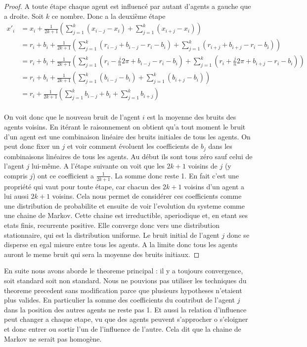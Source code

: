 ﻿\documentclass[a4paper,10pt]{report}
\begin{document}
\begin{proof}
A toute étape chaque agent est influencé par autant d'agents a gauche que a droite. Soit $k$ ce nombre. Donc a la deuxième étape
\begin{equation*}
\begin{split}
x'_i &= x_i + \frac{1}{2k+1} \left( \sum_{j=1}^k (x_{i-j} - x_i) + \sum_{j=1}^k (x_{i+j} - x_i) \right) \\
     &= r_i + b_i + \frac{1}{2k+1} \left( \sum_{j=1}^k (r_{i-j} + b_{i-j} - r_i - b_i) + \sum_{j=1}^k (r_{i+j} + b_{i+j} - r_i - b_i) \right) \\
     &= r_i + b_i + \frac{1}{2k+1} \left( \sum_{j=1}^k (r_i - \frac{j}{n}2 \pi + b_{i-j} - r_i - b_i) + \sum_{j=1}^k (r_i + \frac{j}{n}2 \pi + b_{i+j} - r_i - b_i) \right) \\
     &= r_i + b_i + \frac{1}{2k+1} \left( \sum_{j=1}^k (b_{i-j} - b_i) + \sum_{j=1}^k (b_{i+j} - b_i) \right) \\
     &= r_i + \frac{1}{2k+1} \left( \sum_{j=1}^k b_{i-j} + b_i + \sum_{j=1}^k b_{i+j} \right) \\
\end{split}
\end{equation*}

On voit donc que le nouveau bruit de l'agent $i$ est la moyenne des bruits des agents voisins. En itérant le raisonnement on obtient qu'a tout moment le bruit d'un agent est une combinaison linéaire des bruits initiales de tous les agents. On peut donc fixer un $j$ et voir comment évoluent les coefficients de $b_j$ dans les combinaisons linéaires de tous les agents. Au début ils sont tous zéro sauf celui de l'agent $j$ lui-même. A l’étape suivante on voit que les $2k+1$ voisins de $j$ (y compris $j$) ont ce coefficient a $\frac{1}{2k+1}$. La somme donc reste 1. En fait c'est une propriété qui vaut pour toute étape, car chacun des $2k+1$ voisins d'un agent a lui aussi $2k+1$ voisins. Cela nous permet de considérer ces coefficients comme une distribution de probabilite et ensuite de voir l'evolution du systeme comme une chaine de Markov. Cette chaine est irreductible, aperiodique et, en etant ses etats finis, recurrente positive. Elle converge donc vers une distribution stationnaire, qui est la distribution uniforme. Le bruit initial de l'agent $j$ donc se disperse en egal misure entre tous les agents. A la limite donc tous les agents auront le meme bruit qui sera la moyenne des bruits initiaux.
\end{proof}

En suite nous avons aborde le theoreme principal : il y a toujours convergence, soit standard soit non standard. Nous ne pouvions pas utiliser les techniques du theoreme precedent sans modification parce que plusieurs hypotheses n'etaient plus valides. En particulier la somme des coefficients du contribut de l'agent $j$ dans la position des autres agents ne reste pas 1. Et aussi la relation d'influence peut changer a chaque etape, vu que des agents peuvent s'approcher o s'eloigner et donc entrer ou sortir l'un de l'influence de l'autre. Cela dit que la chaine de Markov ne serait pas homogène.
\end{document}
